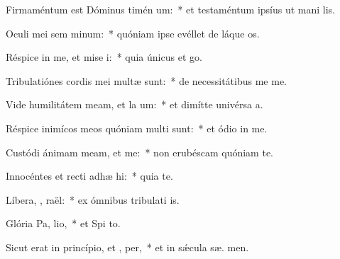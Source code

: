 \item Firmaméntum est Dóminus timén um:~* et testaméntum ipsíus ut mani lis.
\item Oculi mei sem  minum:~* quóniam ipse evéllet de láque  os.
\item Réspice in me, et mise i:~* quia únicus et   go.
\item Tribulatiónes cordis mei multæ sunt:~* de necessitátibus me  me.
\item Vide humilitátem meam, et la um:~* et dimítte univérsa  a.
\item Réspice inimícos meos quóniam multi sunt:~* et ódio in  me.
\item Custódi ánimam meam, et  me:~* non erubéscam quóniam   te.
\item Innocéntes et recti adhæ hi:~* quia  te.
\item Líbera, , raël:~* ex ómnibus tribulati is.
\item Glória Pa,  lio,~* et Spi to.
\item Sicut erat in princípio, et ,  per,~* et in sǽcula sæ. men.
